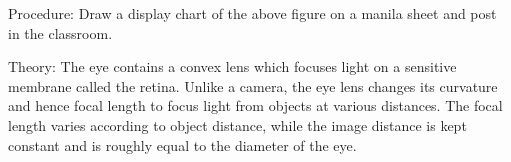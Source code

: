 \begin{multicols}{2}
\begin{description*}
\item[Procedure:]{Draw a display chart of the above figure on a manila sheet and post in the classroom.}
\item[Theory:]{The eye contains a convex lens which focuses light on a sensitive membrane called the retina. Unlike a camera, the eye lens changes its curvature and hence focal length to focus light from objects at various distances. The focal length varies according to object distance, while the image distance is kept constant and is roughly equal to the diameter of the eye.}
\end{description*}



\end{multicols}

\vfill
\pagebreak